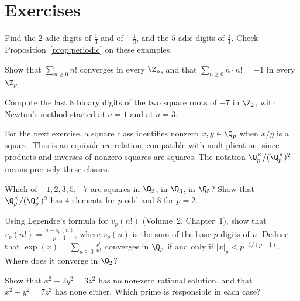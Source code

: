 \section{Exercises}

\begin{exercise}[$\star$]\label{ex:padicdigits}
Find the $2$-adic digits of $\frac13$ and of $-\frac13$, and the $5$-adic digits of $\frac14$. Check Proposition~\ref{prop:periodic} on these examples.
\end{exercise}

\begin{exercise}[$\star$]\label{ex:nfact}
Show that $\sum_{n\ge0}n!$ converges in every $\Z_p$, and that $\sum_{n\ge0}n\cdot n!=-1$ in every $\Z_p$.
\end{exercise}

\begin{exercise}[$\star$]\label{ex:sqrtm7}
Compute the last $8$ binary digits of the two square roots of $-7$ in $\Z_2$, with Newton's method started at $a=1$ and at $a=3$.
\end{exercise}

For the next exercise, a square class identifies nonzero $x,y\in\Q_p$
when $x/y$ is a square. This is an equivalence relation, compatible with
multiplication, since products and inverses of nonzero squares are squares.
The notation $\Q_p^\times/(\Q_p^\times)^2$ means precisely these classes.

\begin{exercise}[$\star\star$]\label{ex:sqclasses}
Which of $-1,2,3,5,-7$ are squares in $\Q_2$, in $\Q_3$, in $\Q_5$? Show that $\Q_p^\times/(\Q_p^\times)^2$ has $4$ elements for $p$ odd and $8$ for $p=2$.
\end{exercise}

\begin{exercise}[$\star\star$]\label{ex:padicexp}
Using Legendre's formula for $v_p(n!)$ (Volume~2, Chapter~1), show that $v_p(n!)=\frac{n-s_p(n)}{p-1}$, where $s_p(n)$ is the sum of the base-$p$ digits of $n$. Deduce that $\exp(x)=\sum_{n\ge0}\frac{x^n}{n!}$ converges in $\Q_p$ if and only if $|x|_p<p^{-1/(p-1)}$. Where does it converge in $\Q_2$?
\end{exercise}

\begin{exercise}[$\star\star$]\label{ex:hasse}
Show that $x^2-2y^2=3z^2$ has no non-zero rational solution, and that $x^2+y^2=7z^2$ has none either. Which prime is responsible in each case?
\end{exercise}

